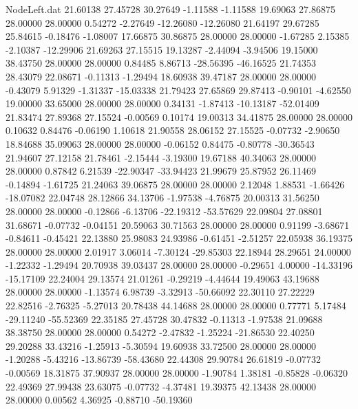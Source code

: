 \begin{filecontents}{NodeLeft.dat}
  21.60138   27.45728   30.27649    -1.11588   -1.11588   19.69063   27.86875   28.00000   28.00000    0.54272   -2.27649  -12.26080  -12.26080
  21.64197   29.67285   25.84615    -0.18476   -1.08007   17.66875   30.86875   28.00000   28.00000   -1.67285    2.15385   -2.10387  -12.29906
  21.69263   27.15515   19.13287    -2.44094   -3.94506   19.15000   38.43750   28.00000   28.00000    0.84485    8.86713  -28.56395  -46.16525
  21.74353   28.43079   22.08671    -0.11313   -1.29494   18.60938   39.47187   28.00000   28.00000   -0.43079    5.91329   -1.31337  -15.03338
  21.79423   27.65869   29.87413    -0.90101   -4.62550   19.00000   33.65000   28.00000   28.00000    0.34131   -1.87413  -10.13187  -52.01409
  21.83474   27.89368   27.15524    -0.00569    0.10174   19.00313   34.41875   28.00000   28.00000    0.10632    0.84476   -0.06190    1.10618
  21.90558   28.06152   27.15525    -0.07732   -2.90650   18.84688   35.09063   28.00000   28.00000   -0.06152    0.84475   -0.80778  -30.36543
  21.94607   27.12158   21.78461    -2.15444   -3.19300   19.67188   40.34063   28.00000   28.00000    0.87842    6.21539  -22.90347  -33.94423
  21.99679   25.87952   26.11469    -0.14894   -1.61725   21.24063   39.06875   28.00000   28.00000    2.12048    1.88531   -1.66426  -18.07082
  22.04748   28.12866   34.13706    -1.97538   -4.76875   20.00313   31.56250   28.00000   28.00000   -0.12866   -6.13706  -22.19312  -53.57629
  22.09804   27.08801   31.68671    -0.07732   -0.04151   20.59063   30.71563   28.00000   28.00000    0.91199   -3.68671   -0.84611   -0.45421
  22.13880   25.98083   24.93986    -0.61451   -2.51257   22.05938   36.19375   28.00000   28.00000    2.01917    3.06014   -7.30124  -29.85303
  22.18944   28.29651   24.00000    -1.22332   -1.29494   20.70938   39.03437   28.00000   28.00000   -0.29651    4.00000  -14.33196  -15.17109
  22.24004   29.13574   21.01261    -0.29219   -4.44644   19.49063   43.19688   28.00000   28.00000   -1.13574    6.98739   -3.32913  -50.66092
  22.30110   27.22229   22.82516    -2.76325   -5.27013   20.78438   44.14688   28.00000   28.00000    0.77771    5.17484  -29.11240  -55.52369
  22.35185   27.45728   30.47832    -0.11313   -1.97538   21.09688   38.38750   28.00000   28.00000    0.54272   -2.47832   -1.25224  -21.86530
  22.40250   29.20288   33.43216    -1.25913   -5.30594   19.60938   33.72500   28.00000   28.00000   -1.20288   -5.43216  -13.86739  -58.43680
  22.44308   29.90784   26.61819    -0.07732   -0.00569   18.31875   37.90937   28.00000   28.00000   -1.90784    1.38181   -0.85828   -0.06320
  22.49369   27.99438   23.63075    -0.07732   -4.37481   19.39375   42.13438   28.00000   28.00000    0.00562    4.36925   -0.88710  -50.19360

\end{filecontents}
